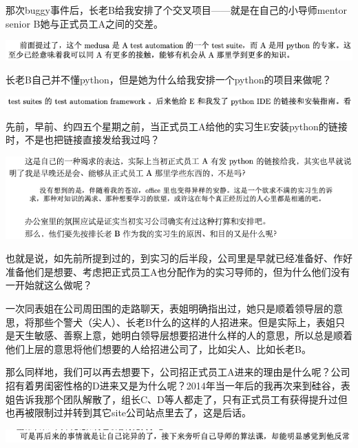 \documentclass[9pt, b5paper]{article}
\begin{document}
那次buggy事件后，长老B给我安排了个交叉项目——就是在自己的小导师mentor senior B她与正式员工A之间的交差。

\begin{center}
\includegraphics[width=.9\linewidth]{./pic/backups_plans_20210508_113348.png}
\end{center}

长老B自己并不懂python，但是她为什么给我安排一个python的项目来做呢？

\begin{center}
\includegraphics[width=.9\linewidth]{./pic/backups_plans_20210508_114150.png}
\end{center}

先前，早前、约四五个星期之前，当正式员工A给他的实习生E安装python的链接时，不是也把链接直接发给我过吗？

\begin{center}
\includegraphics[width=.9\linewidth]{./pic/backups_plans_20210508_114502.png}
\end{center}

也就是说，如先前所提到过的，到实习的后半段，公司里是早就已经准备好、作好准备他们是想要、考虑把正式员工A也分配作为的实习导师的，但为什么他们没有一开始就这么做呢？

一次同表姐在公司周田围的走路聊天，表姐明确指出过，她只是顺着领导层的意思，将那些个警犬（尖人）、长老B什么的这样的人招进来。但是实际上，表姐只是天生敏感、善察上意，她明白领导层想要招进什么样的人的意思，所以总是顺着他们上层的意思将他们想要的人给招进公司了，比如尖人、比如长老B。 

那么同样地，我们可以再去想要下，公司招正式员工A进来的理由是什么呢？公司招有着男闺密性格的D进来又是为什么呢？2014年当一年后的我再次来到硅谷，表姐告诉我那个团队解散了，组长C、D等人都走了，只有正式员工有获得提升过但也再被限制过并转到其它site公司站点里去了，这是后话。 

\begin{center}
\includegraphics[width=.9\linewidth]{./pic/backups_plans_20210508_114812.png}
\end{center}
\end{document}
